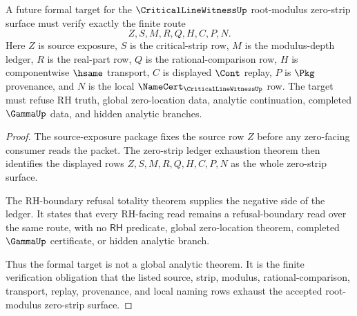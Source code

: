 \begin{theorem}
\label{thm:critical-line-witness-root-formal-target-ledger}
A future formal target for the $\CriticalLineWitnessUp$ root-modulus zero-strip surface must verify exactly the finite route
$$
Z,S,M,R,Q,H,C,P,N .
$$
Here $Z$ is source exposure, $S$ is the critical-strip row, $M$ is the modulus-depth ledger, $R$ is the real-part row, $Q$ is the rational-comparison row, $H$ is componentwise $\hsame$ transport, $C$ is displayed $\Cont$ replay, $P$ is $\Pkg$ provenance, and $N$ is the local $\NameCert_{\CriticalLineWitnessUp}$ row. The target must refuse RH truth, global zero-location data, analytic continuation, completed $\GammaUp$ data, and hidden analytic branches.
\end{theorem}
\begin{proof}
The source-exposure package fixes the source row $Z$ before any zero-facing consumer reads the packet. The zero-strip ledger exhaustion theorem then identifies the displayed rows $Z,S,M,R,Q,H,C,P,N$ as the whole zero-strip surface.

The RH-boundary refusal totality theorem supplies the negative side of the ledger. It states that every RH-facing read remains a refusal-boundary read over the same route, with no $\mathsf{RH}$ predicate, global zero-location theorem, completed $\GammaUp$ certificate, or hidden analytic branch.

Thus the formal target is not a global analytic theorem. It is the finite verification obligation that the listed source, strip, modulus, rational-comparison, transport, replay, provenance, and local naming rows exhaust the accepted root-modulus zero-strip surface.
\end{proof}
